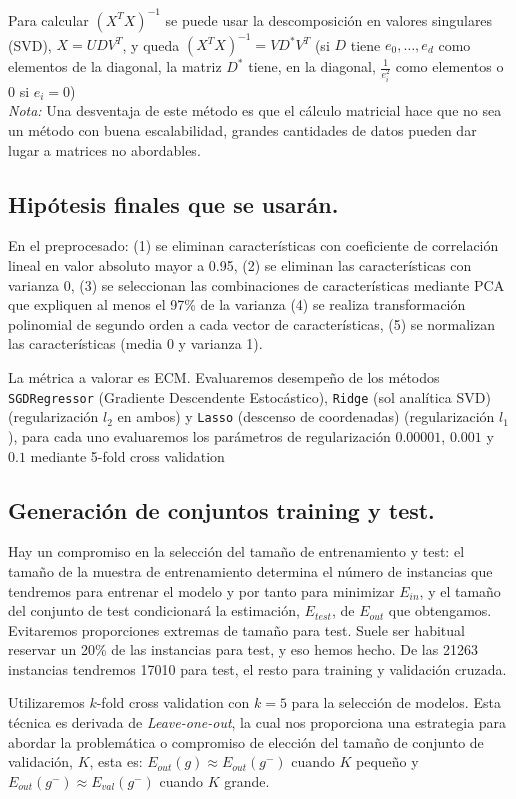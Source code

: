\documentclass[11pt,a4paper]{article}
\theoremstyle{definition}
\begin{document}
	Para calcular $(X^TX)^{-1}$ se puede usar la descomposición en valores singulares (SVD), $X=UDV^T$, y queda $(X^TX)^{-1}=VD^*V^T$ (si $D$ tiene $e_0,\ldots,e_d$ como elementos de la diagonal, la matriz $D^*$ tiene, en la diagonal, $\frac{1}{e_i^2}$ como elementos o $0$ si $e_i=0$) \\
	
	\textit{Nota:} Una desventaja de este método es que el cálculo matricial hace que no sea un método con buena escalabilidad, grandes cantidades de datos pueden dar lugar a matrices no abordables.
	

	\subsection{Hipótesis finales que se usarán.}
	En el preprocesado: (1) se eliminan características con coeficiente de correlación lineal en valor absoluto mayor a 0.95, (2) se eliminan las características con varianza 0, (3) se seleccionan las combinaciones de características mediante PCA que expliquen al menos el 97\% de la varianza (4) se realiza transformación polinomial de segundo orden a cada vector de características, (5) se normalizan las características (media 0 y varianza 1).
	
	La métrica a valorar es ECM. Evaluaremos desempeño de los métodos \texttt{SGDRegressor} (Gradiente Descendente Estocástico), \texttt{Ridge} (sol analítica SVD) (regularización $l_2$ en ambos) y \texttt{Lasso} (descenso de coordenadas) (regularización $l_1$), para cada uno evaluaremos los parámetros de regularización $0.00001$, $0.001$ y $0.1$ mediante 5-fold cross validation
	\subsection{Generación de conjuntos training y test.}
	Hay un compromiso en la selección del tamaño de entrenamiento y test: el tamaño de la muestra de entrenamiento determina el número de instancias que tendremos para entrenar el modelo y por tanto para minimizar $E_{in}$, y el  tamaño del conjunto de test condicionará la estimación, $E_{test}$, de $E_{out}$ que obtengamos. Evitaremos proporciones extremas de tamaño para test. Suele ser habitual reservar un 20\% de las instancias para test, y eso hemos hecho. De las 21263 instancias tendremos 17010 para test, el resto para training y validación cruzada.
	
	Utilizaremos $k$-fold cross validation con $k=5$ para la selección de modelos. Esta técnica es derivada de \textit{Leave-one-out}, la cual nos proporciona una estrategia para abordar la problemática o compromiso de elección del tamaño de conjunto de validación, $K$, esta es: $E_{out}(g)\approx E_{out}(g^-)$ cuando $K$ pequeño y $E_{out}(g^-)\approx E_{val}(g^-)$ cuando $K$ grande. %
	
\end{document}
